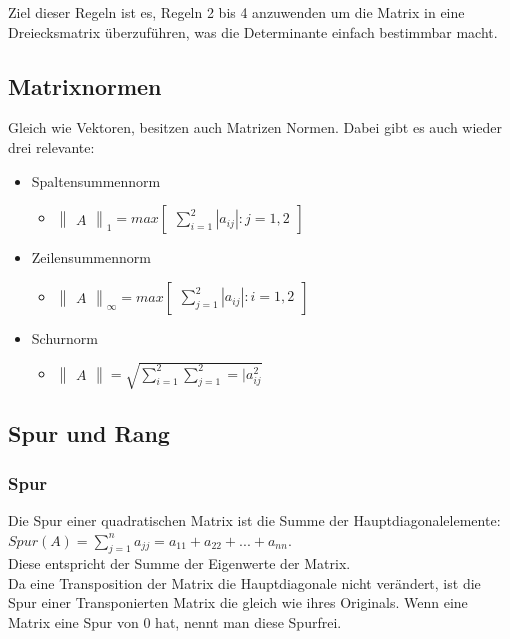 \documentclass{article}
\begin{document}
	Ziel dieser Regeln ist es, Regeln 2 bis 4 anzuwenden um die Matrix in eine Dreiecksmatrix überzuführen, was die Determinante einfach bestimmbar macht.
	\subsection{Matrixnormen}
	Gleich wie Vektoren, besitzen auch Matrizen Normen. Dabei gibt es auch wieder drei relevante:
	\begin{itemize}
		\item{Spaltensummennorm}
		\begin{itemize}
			\item{$\begin{Vmatrix} A \end{Vmatrix}_1=max\begin{bmatrix}\sum_{i=1}^{2}|a_{ij}|:j=1,2\end{bmatrix}$}
		\end{itemize}
		\item{Zeilensummennorm}
		\begin{itemize}
			\item{$\begin{Vmatrix} A \end{Vmatrix}_{\infty}=max \begin{bmatrix} \sum_{j=1}^{2} |a_{ij}|:i=1,2 \end{bmatrix}$}
		\end{itemize}
		\item{Schurnorm}
		\begin{itemize}
			\item{$\begin{Vmatrix} A \end{Vmatrix}=\sqrt{\sum_{i=1}^{2}\sum_{j=1}^{2}=|a_{ij}^2}$}
		\end{itemize}
	\end{itemize}
	\subsection{Spur und Rang}
	\subsubsection{Spur}
	Die Spur einer quadratischen Matrix ist die Summe der Hauptdiagonalelemente: $Spur(A)=\sum_{j=1}^{n}a_{jj}=a_{11}+a_{22}+...+a_{nn}$. \\
	Diese entspricht der Summe der Eigenwerte der Matrix. \\
	Da eine Transposition der Matrix die Hauptdiagonale nicht verändert, ist die Spur einer Transponierten Matrix die gleich wie ihres Originals. Wenn eine Matrix eine Spur von 0 hat, nennt man diese Spurfrei.
\end{document}
